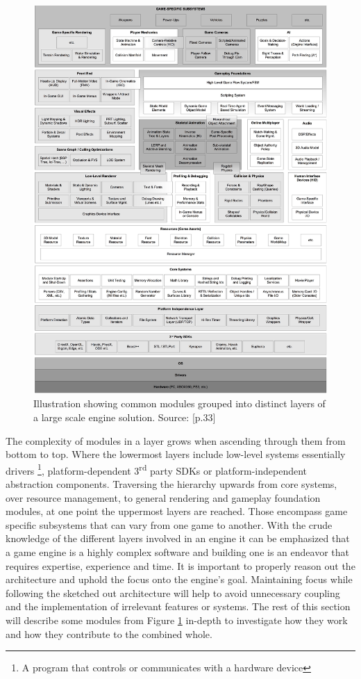 \begin{figure}[h!]
	\centering \includegraphics[width=\linewidth]{PICs/engine_runtime_arch.jpg}
	\caption{Illustration showing common modules grouped into distinct layers of a large scale engine solution. Source: \cite{GEA_2}[p.33]}
	\label{fig:engine_runtime_arch}
\end{figure}

The complexity of modules in a layer grows when ascending through them from bottom to top. Where the lowermost layers include low-level systems essentially drivers \footnote{A program that controls or communicates with a hardware device}, platform-dependent 3\textsuperscript{rd} party \acp{SDK} or platform-independent abstraction components. Traversing the hierarchy upwards from core systems, over resource management, to general rendering and gameplay foundation modules, at one point the uppermost layers are reached. Those encompass game specific subsystems that can vary from one game to another. With the crude knowledge of the different layers involved in an engine it can be emphasized that a game engine is a highly complex software and building one is an endeavor that requires expertise, experience and time. It is important to properly reason out the architecture and uphold the focus onto the engine's goal. Maintaining focus while following the sketched out architecture will help to avoid unnecessary coupling and the implementation of irrelevant features or systems. 
The rest of this section will describe some modules from Figure \ref{fig:engine_runtime_arch} in-depth to investigate how they work and how they contribute to the combined whole.

